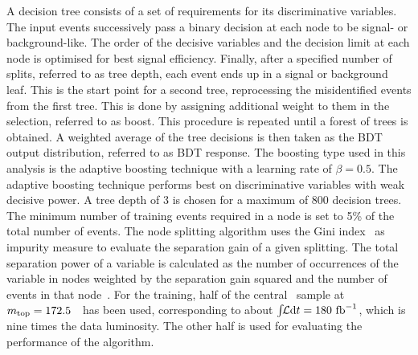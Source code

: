 A decision tree consists of a set of requirements for its discriminative variables. The input events successively pass a binary decision at each node to be signal- or background-like. The order of the decisive variables and the decision limit at each node is optimised for best signal efficiency. Finally, after a specified number of splits, referred to as tree depth, each event ends up in a signal or background leaf. This is the start point for a second tree, reprocessing the misidentified events from the first tree. This is done by assigning additional weight to them in the selection, referred to as boost. This procedure is repeated until a forest of trees is obtained. A weighted average of the tree decisions is then taken as the \gls{BDT} output distribution, referred to as \gls{BDT} response.
%
The boosting type used in this analysis is the adaptive boosting technique with a learning rate of $\beta=0.5$. The adaptive boosting technique performs best on discriminative variables with weak decisive power. A tree depth of 3 is chosen for a maximum of 800 decision trees. The minimum number of training events required in a node is set to 5\% of the total number of events. The node splitting algorithm uses the Gini index~\cite{Hocker:2007ht} as impurity measure to evaluate the separation gain of a given splitting. The total separation power of a variable is calculated as the number of occurrences of the variable in nodes weighted by the separation gain squared and the number of events in that node~\cite{TreeSeparation}. For the training, half of the central \ttbar\ sample at $m_{\mathrm{top}}=172.5$~\GeV\ has been used, corresponding to about $\int\!\!{\mathcal L}\mathrm{d}t=180~\mathrm{fb}^{-1}$, which is nine times the data luminosity. The other half is used for evaluating the performance of the algorithm.

